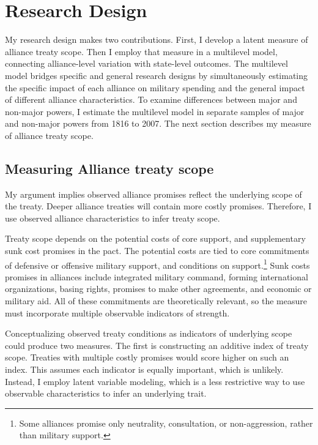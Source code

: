 \documentclass[12pt]{article}
\begin{document}
\section{Research Design} 


My research design makes two contributions. 
First, I develop a latent measure of alliance treaty scope. 
Then I employ that measure in a multilevel model, connecting alliance-level variation with state-level outcomes. 
The multilevel model bridges specific and general research designs by simultaneously estimating the specific impact of each alliance on military spending and the general impact of different alliance characteristics. 
To examine differences between major and non-major powers, I estimate the multilevel model in separate samples of major and non-major powers from 1816 to 2007. 
The next section describes my measure of alliance treaty scope. 


\subsection{Measuring Alliance treaty scope} 


My argument implies observed alliance promises reflect the underlying scope of the treaty. 
Deeper alliance treaties will contain more costly promises. 
Therefore, I use observed alliance characteristics to infer treaty scope.


Treaty scope depends on the potential costs of core support, and supplementary sunk cost promises in the pact. 
The potential costs are tied to core commitments of defensive or offensive military support, and conditions on support.\footnote{Some alliances promise only neutrality, consultation, or non-aggression, rather than military support.}  
Sunk costs promises in alliances include integrated military command, forming international organizations, basing rights, promises to make other agreements, and economic or military aid. 
All of these commitments are theoretically relevant, so the measure must incorporate multiple observable indicators of strength. 


Conceptualizing observed treaty conditions as indicators of underlying scope could produce two measures. 
The first is constructing an additive index of treaty scope. 
Treaties with multiple costly promises would score higher on such an index. 
This assumes each indicator is equally important, which is unlikely. 
Instead, I employ latent variable modeling, which is a less restrictive way to use observable characteristics to infer an underlying trait. 
\end{document}

